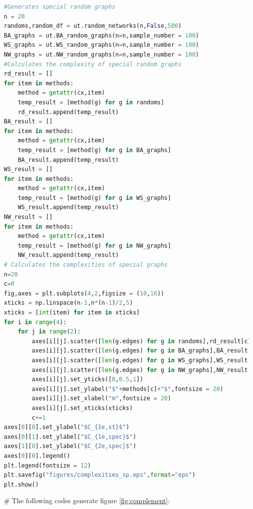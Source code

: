 \documentclass[12pt]{article}
\begin{document}
\begin{lstlisting}[breaklines=true,language=Python]
#Generates special random graphs
n = 20
randoms,random_df = ut.random_networks(n,False,500)
BA_graphs = ut.BA_random_graphs(n=n,sample_number = 100)
WS_graphs = ut.WS_random_graphs(n=n,sample_number = 100)
NW_graphs = ut.NW_random_graphs(n=n,sample_number = 100)
#Calculates the complexity of special random graphs
rd_result = []
for item in methods:
    method = getattr(cx,item)
    temp_result = [method(g) for g in randoms]
    rd_result.append(temp_result)
BA_result = []
for item in methods:
    method = getattr(cx,item)
    temp_result = [method(g) for g in BA_graphs]
    BA_result.append(temp_result)
WS_result = []
for item in methods:
    method = getattr(cx,item)
    temp_result = [method(g) for g in WS_graphs]
    WS_result.append(temp_result)
NW_result = []
for item in methods:
    method = getattr(cx,item)
    temp_result = [method(g) for g in NW_graphs]
    NW_result.append(temp_result)
# Calculates the complexities of special graphs
n=20
c=0
fig,axes = plt.subplots(4,2,figsize = (10,16))
xticks = np.linspace(n-1,n*(n-1)/2,5)
xticks = [int(item) for item in xticks]
for i in range(4):
    for j in range(2):
        axes[i][j].scatter([len(g.edges) for g in randoms],rd_result[c],s=15,color = "black",alpha = 0.7,label = "$G(n,m)$")
        axes[i][j].scatter([len(g.edges) for g in BA_graphs],BA_result[c],s=15,color = "green",label = "BA")
        axes[i][j].scatter([len(g.edges) for g in WS_graphs],WS_result[c],marker = "x",s=15,color = "red",label = "WS")
        axes[i][j].scatter([len(g.edges) for g in NW_graphs],NW_result[c],marker = "s",s=15,color = "blue",label = "NW")
        axes[i][j].set_yticks([0,0.5,1])
        axes[i][j].set_ylabel("$"+methods[c]+"$",fontsize = 20)
        axes[i][j].set_xlabel("m",fontsize = 20)
        axes[i][j].set_xticks(xticks)
        c+=1
axes[0][0].set_ylabel("$C_{1e,st}$")
axes[0][1].set_ylabel("$C_{1e,spec}$")
axes[1][0].set_ylabel("$C_{2e,spec}$")
axes[0][0].legend()
plt.legend(fontsize = 12)
plt.savefig("figures/complexities_sp.eps",format="eps")
plt.show()
\end{lstlisting}
\noindent
\newline
\# The following codes generate figure \ref{fig:complement}:
\end{document}
